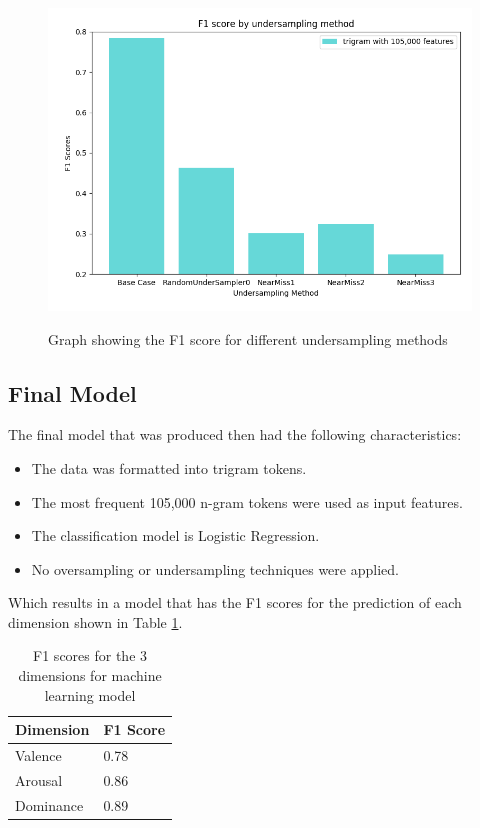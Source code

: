 \begin{figure}[ht]
\caption{Graph showing the F1 score for different undersampling methods}
\centering
\includegraphics[scale=0.6]{graphs/undersample.png}
\label{undersamplegraph}
\end{figure}

\pagebreak

\subsection{Final Model}

The final model that was produced then had the following characteristics: 

\begin{itemize}
    \item The data was formatted into trigram tokens.
    \item The most frequent 105,000 n-gram tokens were used as input features.
    \item The classification model is Logistic Regression.
    \item No oversampling or undersampling techniques were applied.
\end{itemize}

Which results in a model that has the F1 scores for the prediction of each dimension shown in Table \ref{ML:f1}.

\begin{table}
\centering
\label{ML:f1}
\caption{F1 scores for the 3 dimensions for machine learning model}
\begin{tabular}{ |p{3cm}|p{3cm}|}
 \hline
  Dimension & F1 Score \\
 \hline
  Valence & 0.78\\
  Arousal & 0.86 \\
  Dominance & 0.89\\
 \hline
\end{tabular}

\end{table}

